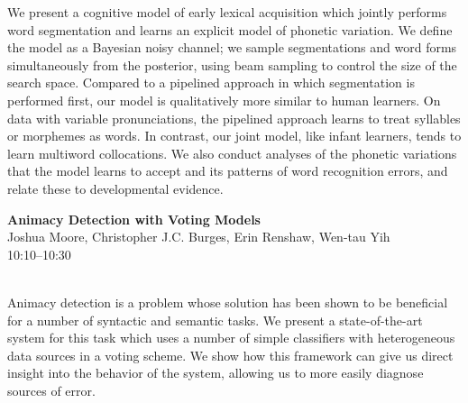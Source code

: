 \documentclass[twoside,makeidx]{book}
\begin{document}
\nopagebreak%
\noindent%
{\small We present a cognitive model of early lexical acquisition which jointly performs word segmentation and learns an explicit model of phonetic variation. We define the model as a Bayesian noisy channel; we sample segmentations and word forms simultaneously from the posterior, using beam sampling to control the size of the search space. Compared to a pipelined approach in which segmentation is performed first, our model is qualitatively more similar to human learners. On data with variable pronunciations, the pipelined approach learns to treat syllables or morphemes as words. In contrast, our joint model, like infant learners, tends to learn multiword collocations. We also conduct analyses of the phonetic variations that the model learns to accept and its patterns of word recognition errors, and relate these to developmental evidence.}
\par\vspace{2em}\noindent%
\begin{minipage}{\linewidth}%
\begin{center}
\textbf{\normalsize Animacy Detection with Voting Models}\\
\normalsize  Joshua Moore,  Christopher J.C. Burges,  Erin Renshaw,  Wen-tau Yih\\
{\small 10:10--10:30}\\
\end{center}
\end{minipage}\\[0.5em]
\nopagebreak%
\noindent%
{\small Animacy detection is a problem whose solution has been shown to be beneficial for a number of syntactic and semantic tasks. We present a state-of-the-art system for this task which uses a number of simple classifiers with heterogeneous data sources in a voting scheme. We show how this framework can give us direct insight into the behavior of the system, allowing us to more easily diagnose sources of error.}
\clearpage
\end{document}
